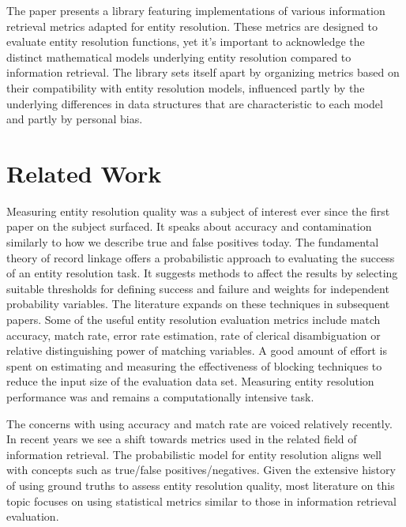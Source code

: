 \documentclass[11pt]{article}
\begin{document}
    The paper presents a library featuring implementations of various
    information retrieval metrics adapted for entity resolution.
    These metrics are designed to evaluate entity resolution functions, yet it's
    important to acknowledge the distinct mathematical models underlying entity
    resolution compared to information retrieval.
    The library sets itself apart by organizing metrics based on their
    compatibility with entity resolution models, influenced partly by the
    underlying differences in data structures that are characteristic to each
    model and partly by personal bias.

    \section{Related Work}\label{sec:related}

    Measuring entity resolution quality was a subject of interest ever since the
    first paper on the subject surfaced\cite{newcombe1959}.
    It speaks about accuracy and contamination similarly to how we describe true
    and false positives today.
    The fundamental theory of record linkage\cite{fs1969} offers a probabilistic
    approach to evaluating the success of an entity resolution task.
    It suggests methods to affect the results by selecting suitable thresholds
    for defining success and failure and weights for independent probability
    variables.
    The literature expands on these techniques in subsequent papers\cite{winkler1990}.
    Some of the useful entity resolution evaluation metrics include match
    accuracy, match rate\cite{jaro1989advances}, error rate estimation, rate
    of clerical disambiguation\cite{winkler1990} or relative distinguishing
    power of matching variables\cite{winkler2014}.
    A good amount of effort is spent on estimating and measuring the
    effectiveness of blocking techniques to reduce the input size of the
    evaluation data set\cite{winkler1990,jaro1989advances}.
    Measuring entity resolution performance was and remains a computationally
    intensive task.
    
    The concerns with using accuracy and match rate are voiced relatively
    recently\cite{Goga2015}.
    In recent years we see a shift towards metrics used in the related field of
    information retrieval.
    The probabilistic model for entity resolution aligns well with concepts such
    as true/false positives/negatives.
    Given the extensive history of using ground truths to assess entity
    resolution quality, most literature on this topic focuses on using
    statistical metrics similar to those in information retrieval
    evaluation\cite{manning2008}.
\end{document}
